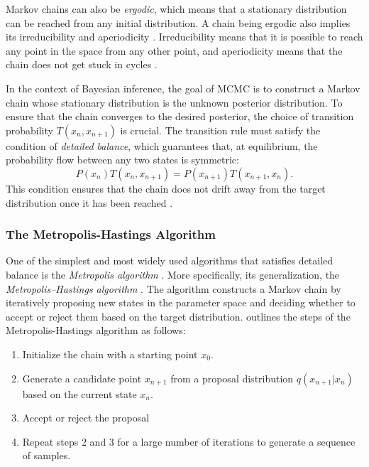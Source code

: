 \documentclass[preprint,longauthor]{aastex631}
\numberwithin{equation}{section}
\begin{document}
Markov chains can also be \textit{ergodic}, which means that a stationary distribution can be reached from any initial distribution. A chain being ergodic also implies its irreducibility and aperiodicity \citep{neal1993probabilistic}. Irreducibility means that it is possible to reach any point in the space from any other point, and aperiodicity means that the chain does not get stuck in cycles \citep{vontoussaintBayesianInferencePhysics2011}.

In the context of Bayesian inference, the goal of MCMC is to construct a Markov chain whose stationary distribution is the unknown posterior distribution. To ensure that the chain converges to the desired posterior, the choice of transition probability $T(x_n, x_{n+1})$ is crucial. The transition rule must satisfy the condition of \textit{detailed balance}, which guarantees that, at equilibrium, the probability flow between any two states is symmetric:
\begin{equation}
  P(x_n)T(x_n, x_{n+1}) = P(x_{n+1})T(x_{n+1}, x_n).
\end{equation}
This condition ensures that the chain does not drift away from the target distribution once it has been reached \citep{vontoussaintBayesianInferencePhysics2011}.

\subsubsection{The Metropolis-Hastings Algorithm}

One of the simplest and most widely used algorithms that satisfies detailed balance is the \textit{Metropolis algorithm} \citep{metropolisEquationStateCalculations1953}. More specifically, its generalization, the \textit{Metropolis–Hastings algorithm} \citep{hastingsMonteCarloSampling1970}. The algorithm constructs a Markov chain by iteratively proposing new states in the parameter space and deciding whether to accept or reject them based on the target distribution. \citet{brewer1BayesianInference2018} outlines the steps of the Metropolis-Hastings algorithm as follows:

\begin{enumerate}
  \item Initialize the chain with a starting point $x_0$.
  \item Generate a candidate point $x_{n+1}$ from a proposal distribution $q(x_{n+1}|x_n)$ based on the current state $x_n$.
  \item Accept or reject the proposal
  \item Repeat steps 2 and 3 for a large number of iterations to generate a sequence of samples.
\end{enumerate}
\end{document}
